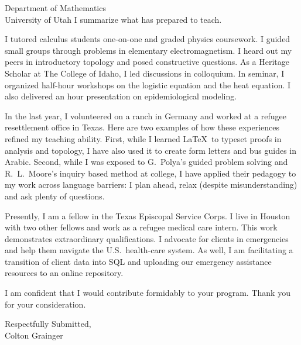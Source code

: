 \documentclass[10pt]{letter}
\newcommand{\term}[1]{\textmd{#1}}
\begin{document}
\begin{letter}{Department of Mathematics\\University of Utah}
I summarize what has prepared to teach. 
\begin{description}[topsep=0pt]
	\item[Tutoring \& Grading] I \term{tutored calculus students} one-on-one and \term{graded physics coursework}. I guided small groups through problems in elementary electromagnetism. I heard out my peers in introductory topology and posed constructive questions. As a Heritage Scholar at The College of Idaho, I led discussions in colloquium. In seminar, I organized half-hour workshops on the logistic equation and the heat equation. I also delivered an hour presentation on \term{epidemiological modeling}. 
	\item[Time Away from School] In the last year, I volunteered on a ranch in Germany and worked at a refugee resettlement office in Texas. Here are two examples of how these experiences refined my teaching ability. First, while I learned \LaTeX\ to typeset proofs in analysis and topology, I have also used it to create form letters and bus guides in Arabic. Second, while I was exposed to G.~Polya's guided problem solving and R.~L.~Moore's inquiry based method at college, I have applied their pedagogy to my work across language barriers: I plan ahead, relax (despite misunderstanding) and ask plenty of questions.
\end{description}

Presently, I am a fellow in the Texas Episcopal Service Corps. I live in Houston with two other fellows and work as a refugee medical care intern. This work demonstrates extraordinary qualifications. I advocate for clients in emergencies and help them navigate the U.S.\ health-care system. As well, I am facilitating a transition of client data into SQL and uploading our emergency assistance resources to an online repository.

I am confident that I would contribute formidably to your program. Thank you for your consideration.

\closing{Respectfully Submitted,\\Colton Grainger}
\end{letter}
\end{document}
